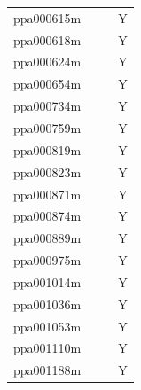 \documentclass[12pt]{article}
\begin{document}
\begin{center}
\begin{longtable}{llll}
	ppa000615m & & &Y \\
	ppa000618m & & &Y \\
	ppa000624m & & &Y \\
	ppa000654m & & &Y \\
	ppa000734m & & &Y \\
	ppa000759m & & &Y \\
	ppa000819m & & &Y \\
	ppa000823m & & &Y \\
	ppa000871m & & &Y \\
	ppa000874m & & &Y \\
	ppa000889m & & &Y \\
	ppa000975m & & &Y \\
	ppa001014m & & &Y \\
	ppa001036m & & &Y \\
	ppa001053m & & &Y \\
	ppa001110m & & &Y \\
	ppa001188m & & &Y \\
\end{longtable}
\end{center}
\end{document}
